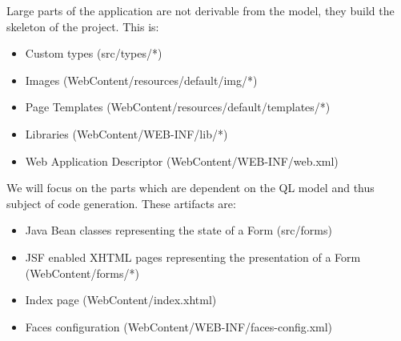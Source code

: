 Large parts of the application are not derivable from the model, they build the skeleton of the project. This is:
\begin{itemize}
\item Custom types (src/types/*)
\item Images (WebContent/resources/default/img/*)
\item Page Templates (WebContent/resources/default/templates/*)
\item Libraries (WebContent/WEB-INF/lib/*)
\item Web Application Descriptor (WebContent/WEB-INF/web.xml)
\end{itemize}

We will focus on the parts which are dependent on the QL model and thus subject of code generation. These artifacts are:
\begin{itemize}
\item Java Bean classes representing the state of a Form (src/forms)
\item JSF enabled XHTML pages representing the presentation of a Form (WebContent/forms/*)
\item Index page (WebContent/index.xhtml)
\item Faces configuration (WebContent/WEB-INF/faces-config.xml)
\end{itemize}

